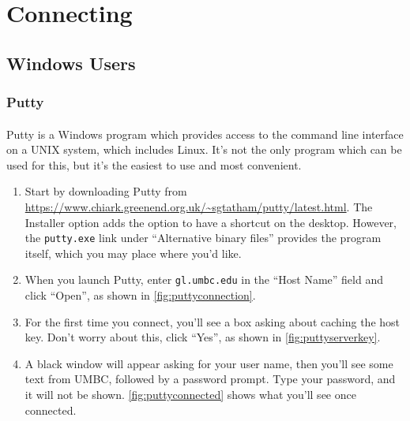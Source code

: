\documentclass[letter,11pt]{article}
\begin{document}
\tableofcontents

\section{Connecting}
\subsection{Windows Users}
\FloatBarrier
\subsubsection{Putty}
\paragraph{}Putty is a Windows program which provides access to the command line interface on a UNIX system, which includes Linux. It's not the only program which can be used for this, but it's the easiest to use and most convenient.

\begin{enumerate}
    \item Start by downloading Putty from \url{https://www.chiark.greenend.org.uk/~sgtatham/putty/latest.html}. The Installer option adds the option to have a shortcut on the desktop. However, the \texttt{putty.exe} link under ``Alternative binary files'' provides the program itself, which you may place where you'd like.
    \item When you launch Putty, enter \texttt{gl.umbc.edu} in the ``Host Name'' field and click ``Open'', as shown in \autoref{fig:puttyconnection}.
    \item For the first time you connect, you'll see a box asking about caching the host key. Don't worry about this, click ``Yes'', as shown in \autoref{fig:puttyserverkey}.
    \item A black window will appear asking for your user name, then you'll see some text from UMBC, followed by a password prompt. Type your password, and it will not be shown. \autoref{fig:puttyconnected} shows what you'll see once connected.
\end{enumerate}
\end{document}
